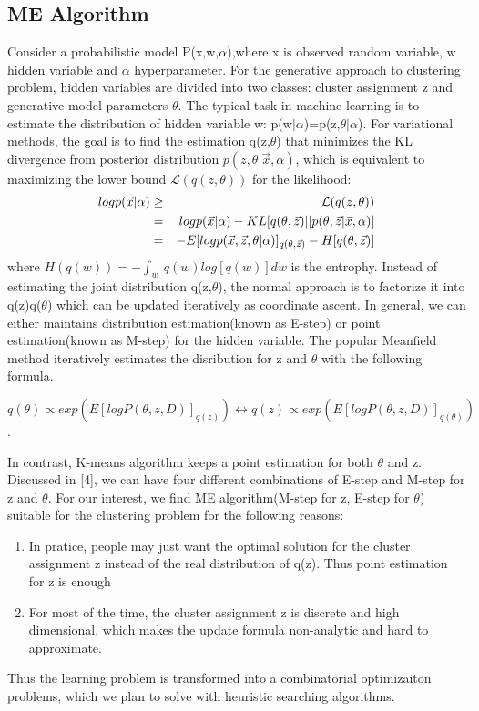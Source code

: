 \documentclass{article}
\begin{document}
\subsection{ME Algorithm}
Consider a probabilistic model P(x,w,$\alpha$),where x is observed random variable, w hidden variable and $\alpha$ hyperparameter.   
For the generative approach to clustering problem, hidden variables are divided into two classes: cluster assignment z and generative model parameters $\theta$.  
The typical task in machine learning is to estimate the distribution of hidden variable w: p(w$|\alpha$)=p(z,$\theta|\alpha$).
For variational methods, the goal is to find the estimation q(z,$\theta$) that minimizes the KL divergence from posterior distribution $p(z,\theta |\vec x,\alpha)$, which 
is equivalent to maximizing the lower bound $\mathcal{L}(q(z,\theta))$ for the likelihood:
\begin{eqnarray*}
log p(\vec x |\alpha)
&\geq&\mathcal{L}(q(z,\theta)) \\
&=&log p(\vec x | \alpha)-KL[q(\theta,\vec z) || p(\theta,\vec z | \vec x,\alpha)] \\
&=&-\boldmath{E}[log p(\vec x,\vec z, \theta | \alpha)]_{q(\theta,\vec z)}-H[q(\theta,\vec z)] 
\end{eqnarray*}
where $H(q(w))=-\int_w \ q(w)log [q(w)] dw$ is the entrophy.
Instead of estimating the joint distribution q(z,$\theta$), the normal approach is to factorize it into q(z)q($\theta$) which can be updated iteratively as coordinate ascent. 
In general, we can either maintains distribution estimation(known as E-step) or point estimation(known as M-step) for the hidden variable.
The popular Meanfield method iteratively estimates the disribution for z and $\theta$ with the following formula.
\begin{center}
$q (\theta ) \propto exp(E[log P(\theta, z, D)]_{q(z)} ) \longleftrightarrow q (z) \propto  exp(E[log P(\theta, z, D)]_{q (\theta )})$.
\end{center}
In contrast, K-means algorithm keeps a point estimation for both $\theta$ and z. 
Discussed in [4], we can have four different combinations of E-step and M-step for z and $\theta$. 
For our interest, we find ME algorithm(M-step for z, E-step for $\theta$) suitable for the clustering problem for the following reasons:
\begin{enumerate}
 \item In pratice, people may just want the optimal solution for the cluster assignment z instead of the real distribution of q(z).
Thus point estimation for z is enough
 \item For most of the time, the cluster assignment z is discrete and high dimensional, which makes the update formula non-analytic and hard to approximate.
\end{enumerate}
Thus the learning problem is transformed into a combinatorial optimizaiton problems, which we plan to solve with heuristic searching algorithms.
\end{document}
